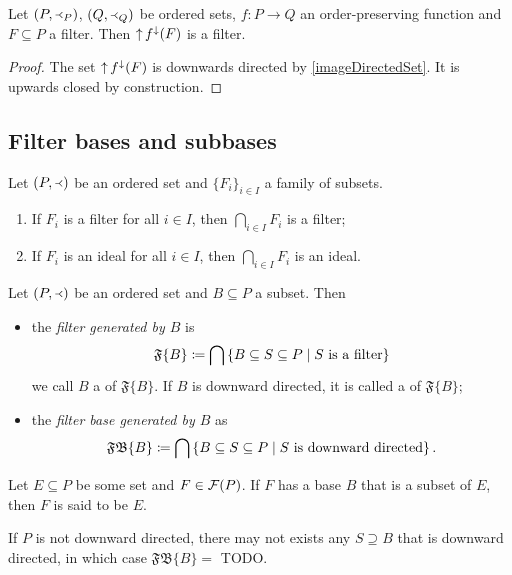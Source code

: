 \begin{lemma} \label{imageFilter}
Let $\left( P,\Yleft_P \right)$, $\left( Q, \Yleft_Q \right)$ be ordered sets, $f: P\to Q$ an order-preserving function and $F\subseteq P$ a filter. Then $\operatorname{\uparrow} f^{\downarrow}(F)$ is a filter.
\end{lemma}
\begin{proof}
The set $\operatorname{\uparrow} f^{\downarrow}(F)$ is downwards directed by \ref{imageDirectedSet}. It is upwards closed by construction.
\end{proof}

\subsection{Filter bases and subbases}

\begin{lemma}
Let $\left( P,\Yleft \right)$ be an ordered set and $\{F_i\}_{i\in I}$ a family of subsets.
\begin{enumerate}
\item If $F_i$ is a filter for all $i\in I$, then $\bigcap_{i\in I}F_i$ is a filter;
\item If $F_i$ is an ideal for all $i\in I$, then $\bigcap_{i\in I}F_i$ is an ideal.
\end{enumerate}
\end{lemma}

\begin{definition}
Let $\left( P,\Yleft \right)$ be an ordered set and $B\subseteq P$ a subset. Then
\begin{itemize}
\item the \emph{filter generated by $B$} is
\[ \mathfrak{F}\{B\} \coloneqq \bigcap\left\{ B \subseteq S\subseteq P \;\middle|\; \text{$S$ is a filter} \right\} \]
we call $B$ a  of $\mathfrak{F}\{B\}$. If $B$ is downward directed, it is called a  of $\mathfrak{F}\{B\}$;
\item the \emph{filter base generated by $B$} as
\[ \mathfrak{FB}\{B\} \coloneqq \bigcap\left\{ B \subseteq S\subseteq P \;\middle|\; \text{$S$ is downward directed} \right\}. \]
\end{itemize}
Let $E\subseteq P$ be some set and $F\in \operatorname{\mathcal{F}}(P)$. If $F$ has a base $B$ that is a subset of $E$, then $F$ is said to be  $E$.  
\end{definition}

If $P$ is not downward directed, there may not exists any $S \supseteq B$ that is downward directed, in which case $\mathfrak{FB}\{B\} =$ TODO.

